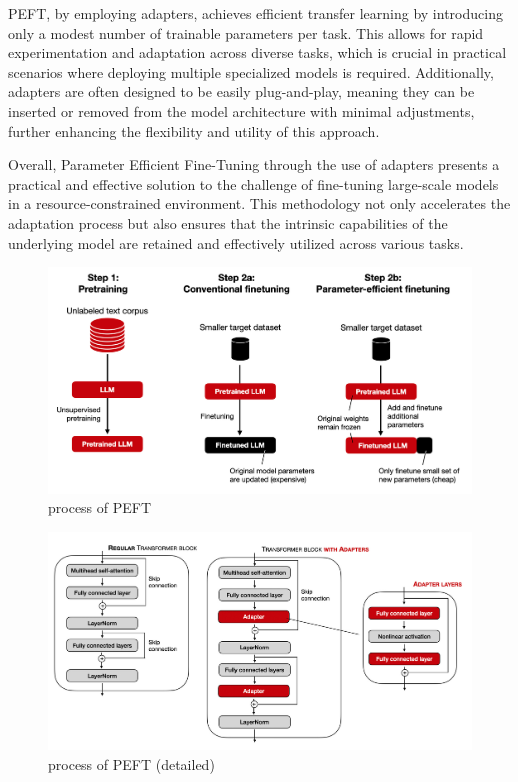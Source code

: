 \documentclass[conference]{IEEEtran}
\begin{document}
PEFT, by employing adapters, achieves efficient transfer learning by introducing only a modest number of trainable parameters per task. This allows for rapid experimentation and adaptation across diverse tasks, which is crucial in practical scenarios where deploying multiple specialized models is required. Additionally, adapters are often designed to be easily plug-and-play, meaning they can be inserted or removed from the model architecture with minimal adjustments, further enhancing the flexibility and utility of this approach.

Overall, Parameter Efficient Fine-Tuning through the use of adapters presents a practical and effective solution to the challenge of fine-tuning large-scale models in a resource-constrained environment. This methodology not only accelerates the adaptation process but also ensures that the intrinsic capabilities of the underlying model are retained and effectively utilized across various tasks.

\cite{Poth2023}

\begin{figure}[h!]
    \centering
    \includegraphics[width=.65\linewidth]{pictures/PEFT1.png}
    \caption[PEFT1]{process of PEFT  \cite{Raschka2023}}
    \label{fig:PEFT1}
\end{figure}

\begin{figure}[h!]
    \centering
    \includegraphics[width=.65\linewidth]{pictures/PEFT2.jpg}
    \caption[PEFT2]{process of PEFT (detailed) \cite{Raschka2023}}
    \label{fig:PEFT2}
\end{figure}
\end{document}
